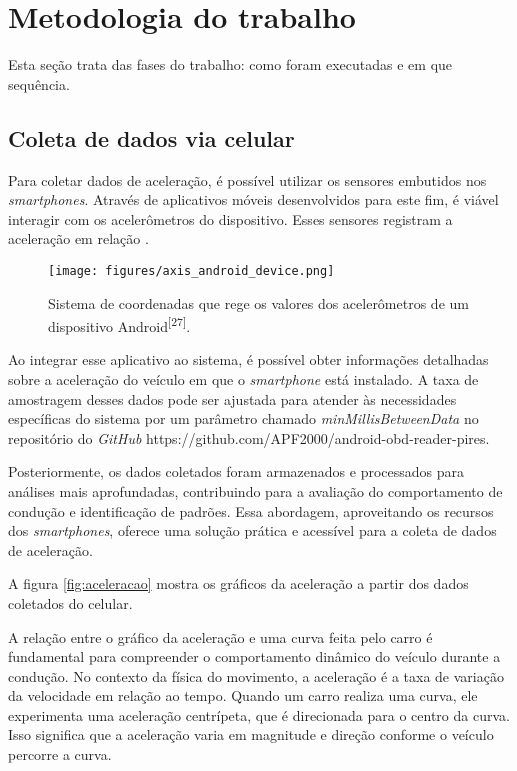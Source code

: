 \chapter{Metodologia do trabalho}
\label{CAP3}

Esta seção trata das fases do trabalho: como foram  executadas e em que sequência.



\section{Coleta de dados via celular}
Para coletar dados de aceleração, é possível utilizar os sensores embutidos nos \textit{smartphones}. Através de aplicativos móveis desenvolvidos para este fim, é viável interagir com os acelerômetros do dispositivo. Esses sensores registram a aceleração em relação . 


\begin{figure}[hp]
    \centering
    
    \texttt{[image: figures/axis\_android\_device.png]}
    
    \caption{Sistema de coordenadas que rege os valores dos acelerômetros de um dispositivo Android\textsuperscript{[27]}.}
    
    \label{fig:axis_android}
\end{figure}

Ao integrar esse aplicativo ao sistema, é possível obter informações detalhadas sobre a aceleração do veículo em que o \textit{smartphone} está instalado. A taxa de amostragem desses dados pode ser ajustada para atender às necessidades específicas do sistema por um parâmetro chamado \textit{minMillisBetweenData} no repositório do \textit{GitHub} https://github.com/APF2000/android-obd-reader-pires. 

Posteriormente, os dados coletados foram armazenados e processados para análises mais aprofundadas, contribuindo para a avaliação do comportamento de condução e identificação de padrões. Essa abordagem, aproveitando os recursos dos \textit{smartphones}, oferece uma solução prática e acessível para a coleta de dados de aceleração.

A figura \ref{fig:aceleracao} mostra os gráficos da aceleração a partir dos dados coletados do celular. 

A relação entre o gráfico da aceleração e uma curva feita pelo carro é fundamental para compreender o comportamento dinâmico do veículo durante a condução. No contexto da física do movimento, a aceleração é a taxa de variação da velocidade em relação ao tempo. Quando um carro realiza uma curva, ele experimenta uma aceleração centrípeta, que é direcionada para o centro da curva. Isso significa que a aceleração varia em magnitude e direção conforme o veículo percorre a curva.


